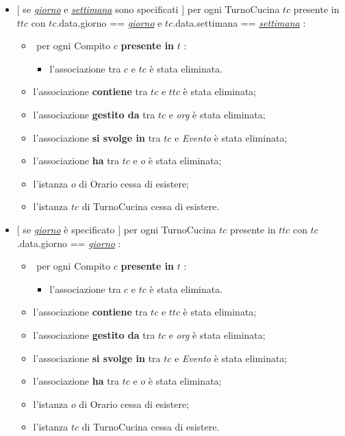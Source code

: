 \begin{itemize}
   \item $[$ se \underline{\textit{giorno}} e \underline{\textit{settimana}} sono specificati $]$ \textlangle per ogni TurnoCucina $tc$ presente in $ttc$ con $tc$.data.giorno == \underline{\textit{giorno}} e $tc$.data.settimana == \underline{\textit{settimana}} \textrangle:
\begin{itemize}
   \item \textlangle $ $ per ogni Compito $c$ \textbf{presente in} $t$ \textrangle:
    \begin{itemize}
        \item l'associazione tra $c$ e $tc$ è stata eliminata.
        \end{itemize}
    \item l'associazione \textbf{contiene} tra $tc$ e $ttc$ è stata eliminata;
    \item l'associazione \textbf{gestito da} tra $tc$ e \textit{org} è stata eliminata;
\item l'associazione \textbf{si svolge in} tra $tc$ e \textit{Evento} è stata eliminata;
  \item l'associazione \textbf{ha} tra $tc$ e $o$ è stata eliminata;
    \item l'istanza $o$ di Orario cessa di esistere;
    \item l'istanza $tc$ di TurnoCucina cessa di esistere.
\end{itemize}
   \item $[$ se \underline{\textit{giorno}} è specificato $]$ \textlangle per ogni TurnoCucina $tc$ presente in $ttc$ con $tc$.data.giorno == \underline{\textit{giorno}} \textrangle:
\begin{itemize}
   \item \textlangle $ $ per ogni Compito $c$ \textbf{presente in} $t$ \textrangle:
    \begin{itemize}
        \item l'associazione tra $c$ e $tc$ è stata eliminata.
    \end{itemize}
    \item l'associazione \textbf{contiene} tra $tc$ e $ttc$ è stata eliminata;
    \item l'associazione \textbf{gestito da} tra $tc$ e \textit{org} è stata eliminata;
\item l'associazione \textbf{si svolge in} tra $tc$ e \textit{Evento} è stata eliminata;
    \item l'associazione \textbf{ha} tra $tc$ e $o$ è stata eliminata;
    \item l'istanza $o$ di Orario cessa di esistere;
    \item l'istanza $tc$ di TurnoCucina cessa di esistere.
\end{itemize}


\end{itemize}
